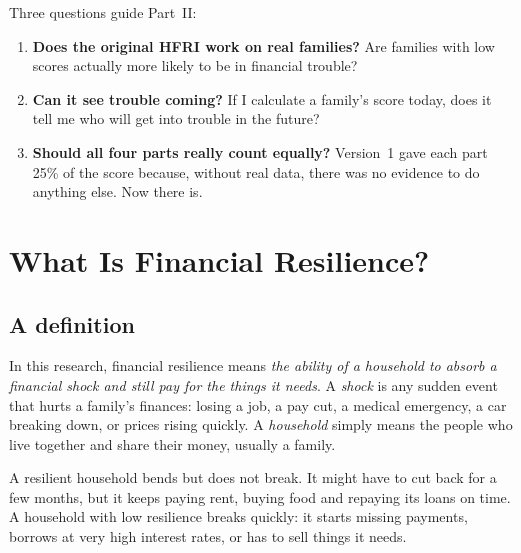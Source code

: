 \documentclass[11pt,a4paper]{article}
\newcommand{\pct}{\%}
\begin{document}
Three questions guide Part~II:
\begin{enumerate}
\item \textbf{Does the original HFRI work on real families?} Are families with low scores actually more likely to be in
financial trouble?
\item \textbf{Can it see trouble coming?} If I calculate a family's score today, does it tell me who will get into
trouble in the future?
\item \textbf{Should all four parts really count equally?} Version~1 gave each part 25\pct{} of the score because,
without real data, there was no evidence to do anything else. Now there is.
\end{enumerate}

\begin{center}
\vspace{6pt}{\Large\bfseries Part I: Background and Version 1}\vspace{4pt}
\end{center}

\section{What Is Financial Resilience?}
\subsection{A definition}
In this research, financial resilience means \emph{the ability of a household to absorb a financial shock and still pay
for the things it needs}. A \emph{shock} is any sudden event that hurts a family's finances: losing a job, a pay cut, a
medical emergency, a car breaking down, or prices rising quickly. A \emph{household} simply means the people who live
together and share their money, usually a family.

A resilient household bends but does not break. It might have to cut back for a few months, but it keeps paying rent,
buying food and repaying its loans on time. A household with low resilience breaks quickly: it starts missing payments,
borrows at very high interest rates, or has to sell things it needs.
\end{document}
